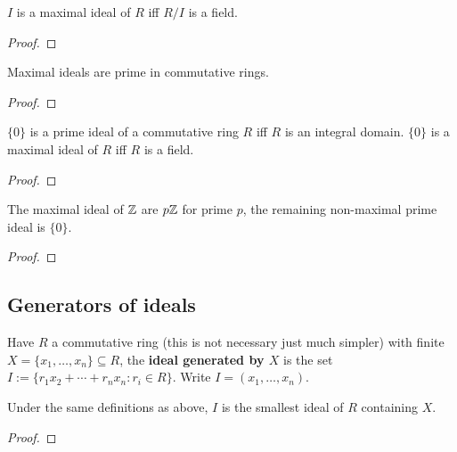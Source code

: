 \documentclass{report}
\begin{document}
\begin{proposition}
    $I$ is a maximal ideal of $R$ iff $R/I$ is a field.
    \begin{proof}
        
    \end{proof}
\end{proposition}

\begin{corollary}
    Maximal ideals are prime in commutative rings. \begin{proof}
        
    \end{proof}
\end{corollary}

\begin{corollary}
    $\{0\}$ is a prime ideal of a commutative ring $R$ iff $R$ is an integral domain. $\{0\}$ is a maximal ideal of $R$ iff $R$ is a field. \begin{proof}
        
    \end{proof}
\end{corollary}

\begin{corollary}
    The maximal ideal of $\mathbb{Z}$ are $p\mathbb{Z}$ for prime $p$, the remaining non-maximal prime ideal is $\{0\}$. \begin{proof}
        
    \end{proof}
\end{corollary}

\subsection{Generators of ideals}

\begin{definition}
    Have $R$ a commutative ring (this is not necessary just much simpler) with finite $X=\{x_1,\ldots,x_n\}\subseteq R$, the \textbf{ideal generated by $X$} is the set $I:=\{r_1x_2+\cdots+r_nx_n:r_i\in R\}$. Write $I=(x_1,\ldots,x_n)$.
\end{definition}

\begin{lemma}
    Under the same definitions as above, $I$ is the smallest ideal of $R$ containing $X$.\begin{proof}
        
    \end{proof}
\end{lemma}
\end{document}
